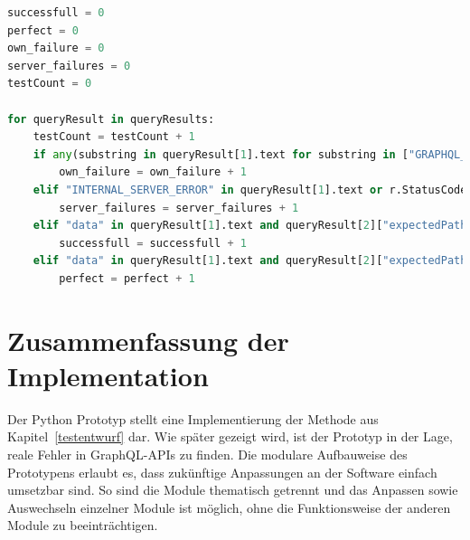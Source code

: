 \begin{lstlisting}[language=Python, caption={Auswertung der Antworten}, label={auswert}]
successfull = 0
perfect = 0
own_failure = 0
server_failures = 0
testCount = 0

for queryResult in queryResults:
    testCount = testCount + 1
    if any(substring in queryResult[1].text for substring in ["GRAPHQL_PARSE_FAILED", "GRAPHQL_VALIDATION_FAILED"]):
        own_failure = own_failure + 1
    elif "INTERNAL_SERVER_ERROR" in queryResult[1].text or r.StatusCode == 500:
        server_failures = server_failures + 1
    elif "data" in queryResult[1].text and queryResult[2]["expectedPathLength"] > queryResult[2]["pathLengthFromResult"]:
        successfull = successfull + 1
    elif "data" in queryResult[1].text and queryResult[2]["expectedPathLength"] == queryResult[2]["pathLengthFromResult"]:
        perfect = perfect + 1
\end{lstlisting}

\newpage

\section{Zusammenfassung der Implementation}

Der Python Prototyp stellt eine Implementierung der Methode aus Kapitel~\ref{testentwurf} dar.
Wie später gezeigt wird, ist der Prototyp in der Lage, reale Fehler in GraphQL-APIs zu finden.
Die modulare Aufbauweise des Prototypens erlaubt es, dass zukünftige Anpassungen an der Software einfach umsetzbar sind.
So sind die Module thematisch getrennt und das Anpassen sowie Auswechseln einzelner Module ist möglich, ohne die Funktionsweise
der anderen Module zu beeinträchtigen.


